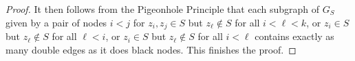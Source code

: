 \begin{proof}
It then follows from the Pigeonhole Principle that each subgraph of $G_S$ given by a pair of nodes $i<j$ for $z_i,z_j\in S$ but $z_\ell\notin S$ for all $i<\ell<k$, or $z_i\in S$ but $z_\ell\notin S$ for all $\ell < i$, or $z_i \in S$ but $z_\ell\notin S$ for all $i <\ell$ contains exactly as many double edges as it does black nodes. 
This finishes the proof. 
% 
% 
% 
% 

\end{proof}
